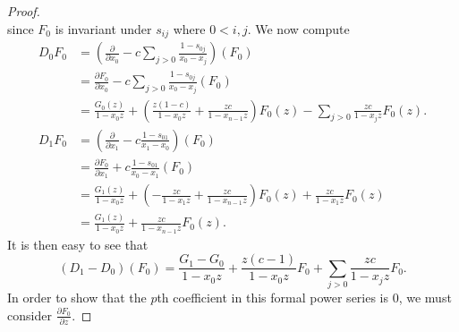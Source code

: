 \documentclass{amsart}
\numberwithin{equation}{section}
\theoremstyle{definition}
\begin{document}
\begin{proof}
\[\]
since $F_0$ is invariant under $s_{ij}$ where $0 < i,j$. We now compute
\begin{align*}
D_0F_0&=\left(\frac{\partial}{\partial x_0}-c\sum_{j > 0} \frac{1-s_{0j}}{x_0-x_j}\right)(F_0)\\
&=\frac{\partial F_0}{\partial x_0}-c\sum_{j > 0} \frac{1-s_{0j}}{x_0-x_j}(F_0)\\
&=\frac{G_0(z)}{1-x_0z}+\left(\frac{z(1-c)}{1-x_0z}+\frac{zc}{1-x_{n-1}z}\right)F_0(z)-\sum_{j > 0} \frac{zc}{1-x_jz}F_0(z).\\
D_1F_0&=\left(\frac{\partial}{\partial x_1}-c \frac{1-s_{01}}{x_1-x_0}\right)(F_0)\\
&=\frac{\partial F_0}{\partial x_1}+c \frac{1-s_{01}}{x_0-x_1}(F_0)\\
&=\frac{G_1(z)}{1-x_0z}+\left(-\frac{zc}{1-x_1z}+\frac{zc}{1-x_{n-1}z}\right)F_0(z)+\frac{zc}{1-x_1z}F_0(z)\\
&=\frac{G_1(z)}{1-x_0z}+\frac{zc}{1-x_{n-1}z}F_0(z).
\end{align*}
It is then easy to see that 
\[
(D_1-D_0)(F_0)=\frac{G_1-G_0}{1-x_0z}+\frac{z(c-1)}{1-x_0z}F_0+\sum_{j>0} \frac{zc}{1-x_jz}F_0.
\]
In order to show that the $p$th coefficient in this formal power series is $0$, we must consider $\frac{\partial F_0}{\partial z}$. 


\end{proof}
\end{document}
